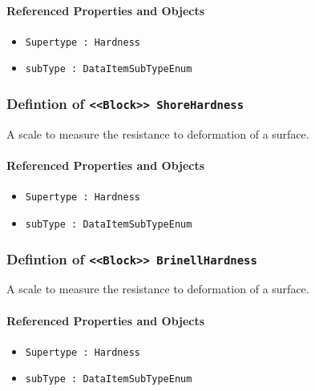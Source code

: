 \FloatBarrier
\paragraph{Referenced Properties and Objects}

\begin{itemize}
\item \texttt{Supertype : Hardness}

\item \texttt{subType : DataItemSubTypeEnum}

\end{itemize}
\FloatBarrier
\subsubsection{Defintion of \texttt{<<Block>> ShoreHardness}}
  \label{type:ShoreHardness}

\FloatBarrier

A scale to measure the resistance to deformation of a surface.

\FloatBarrier
\paragraph{Referenced Properties and Objects}

\begin{itemize}
\item \texttt{Supertype : Hardness}

\item \texttt{subType : DataItemSubTypeEnum}

\end{itemize}
\FloatBarrier
\subsubsection{Defintion of \texttt{<<Block>> BrinellHardness}}
  \label{type:BrinellHardness}

\FloatBarrier

A scale to measure the resistance to deformation of a surface.

\FloatBarrier
\paragraph{Referenced Properties and Objects}

\begin{itemize}
\item \texttt{Supertype : Hardness}

\item \texttt{subType : DataItemSubTypeEnum}

\end{itemize}
\FloatBarrier
